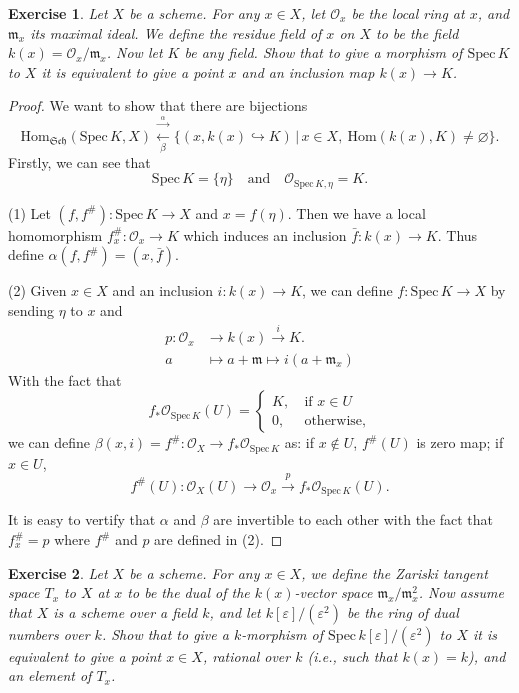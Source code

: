 \documentclass[12pt]{amsart}
\newtheorem{exe}{Exercise}[subsection]
\begin{document}
\begin{exe}
	Let $X$ be a scheme. For any $x\in X$, let $\mathcal{O}_x$ be the local ring at $x$, and $\mathfrak{m}_x$ its maximal ideal. We define the \emph{residue field} of $x$ on $X$ to be the field $k(x)=\mathcal{O}_x/\mathfrak{m}_x$. Now let $K$ be any field. Show that to give a morphism of $\mathrm{Spec}\,K$ to $X$ it is equivalent to give a point $x$ and an inclusion map $k(x)\to K$.
\end{exe}
\begin{proof}
	We want to show that there are bijections$$\mathrm{Hom}_{\mathfrak{Sch}}\left(\mathrm{Spec}\,K,X\right)\stackrel{\xrightarrow{\alpha}}{\xleftarrow[\beta]{}}\{(x,k(x)\hookrightarrow K)\,|\,x\in X,\ \mathrm{Hom}(k(x),K)\neq\varnothing\}.$$
	Firstly, we can see that$$\mathrm{Spec}\,K=\{\eta\}\quad\text{and}\quad\mathcal{O}_{\mathrm{Spec}\,K,\eta}=K.$$
	
	(1) Let $(f,f^\#):\mathrm{Spec}\,K\to X$ and $x=f(\eta)$. Then we have a local homomorphism $f_x^\#:\mathcal{O}_x\to K$ which induces an inclusion $\bar{f}:k(x)\to K$. Thus define $\alpha(f,f^\#)=(x,\bar{f})$.
	
	(2) Given $x\in X$ and an inclusion $i:k(x)\to K$, we can define $f:\mathrm{Spec}\,K\to X$ by sending $\eta$ to $x$ and
	\begin{align*}
	p:\mathcal{O}_x&\to k(x)\xrightarrow{i} K.\\
	a&\mapsto a+\mathfrak{m}\mapsto i(a+\mathfrak{m}_x)
	\end{align*}
	With the fact that
	\begin{equation*}
	f_*\mathcal{O}_{\mathrm{Spec}\,K}(U)=\left\{\begin{matrix}
	K,\ &\text{if }x\in U\\
	0,\ &\text{otherwise},
	\end{matrix}
	\right.
	\end{equation*}
	we can define $\beta(x,i)=f^\#:\mathcal{O}_X\to f_*\mathcal{O}_{\mathrm{Spec}\,K}$ as: if $x\notin U$, $f^\#(U)$ is zero map; if $x\in U$,$$f^\#(U):\mathcal{O}_X(U)\to\mathcal{O}_x\xrightarrow{p}f_*\mathcal{O}_{\mathrm{Spec}\,K}(U).$$
	
	It is easy to vertify that $\alpha$ and $\beta$ are invertible to each other with the fact that $f^\#_x=p$ where $f^\#$ and $p$ are defined in (2).
\end{proof}

\begin{exe}
	Let $X$ be a scheme. For any $x\in X$, we define the \emph{Zariski tangent space} $T_x$ to $X$ at $x$ to be the dual of the $k(x)$-vector space $\mathfrak{m}_x/\mathfrak{m}_x^2$. Now assume that $X$ is a scheme over a field $k$, and let $k[\varepsilon]/(\varepsilon^2)$ be the ring of dual numbers over $k$. Show that to give a $k$-morphism of $\mathrm{Spec}\,k[\varepsilon]/(\varepsilon^2)$ to $X$ it is equivalent to give a point $x\in X$, \emph{rational over} $k$ (i.e., such that $k(x)=k$), and an element of $T_x$.
\end{exe}
\end{document}
